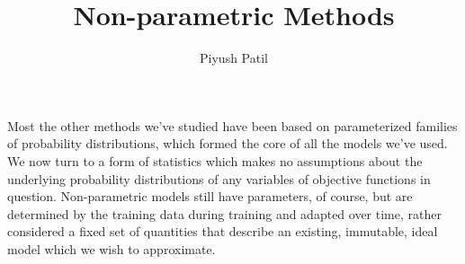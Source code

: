 \documentclass{article}
\begin{document}
\title{Non-parametric Methods}
\author{Piyush Patil}
\maketitle

Most the other methods we've studied have been based on parameterized families of probability distributions, which formed the core of all the models we've used. We now turn to a form of statistics which makes no assumptions about the underlying probability distributions of any variables of objective functions in question. Non-parametric models still have parameters, of course, but are determined by the training data during training and adapted over time, rather considered a fixed set of quantities that describe an existing, immutable, ideal model which we wish to approximate.
\end{document}
